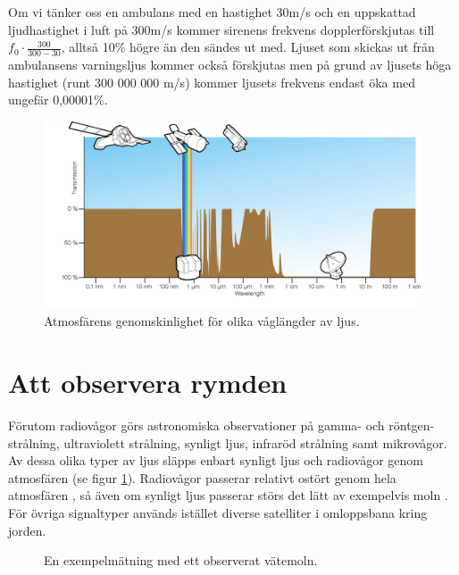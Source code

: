 Om vi tänker oss en ambulans med en hastighet 30m/s och en uppskattad ljudhastighet i luft på 300m/s kommer sirenens frekvens dopplerförskjutas till $f_0 \cdot \frac{300}{300-30}$, alltså 10\% högre än den sändes ut med. Ljuset som skickas ut från ambulansens varningsljus kommer också förskjutas men på grund av ljusets höga hastighet (runt 300 000 000 m/s) kommer ljusets frekvens endast öka med ungefär 0,00001\%.

\begin{figure}
    \centering
    \includegraphics{pics/atmo.jpg}
    \caption{Atmosfärens genomskinlighet för olika våglängder av ljus.}
    \label{fig:atmo_transparent}
\end{figure}

\section{Att observera rymden}
Förutom radiovågor görs astronomiska observationer på gamma- och röntgen-strålning, ultraviolett strålning, synligt ljus, infraröd strålning samt mikrovågor. Av dessa olika typer av ljus släpps enbart synligt ljus och radiovågor genom atmosfären (se figur \ref{fig:atmo_transparent}). Radiovågor passerar relativt ostört genom hela atmosfären \autocite{nasa:radiowaves}, så även om synligt ljus passerar störs det lätt av exempelvis moln \autocite{wikipedia:astro_seeing}. För övriga signaltyper används istället diverse satelliter i omloppsbana kring jorden.

\begin{figure}
    \centering
    \caption{En exempelmätning med ett observerat vätemoln.}
    \label{fig:single_cloud}
\end{figure}

